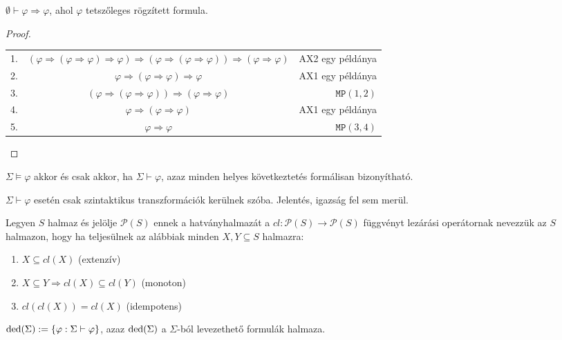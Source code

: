 \begin{exmpl} $\emptyset \vdash \varphi \Rightarrow \varphi$, ahol $\varphi$ tetszőleges rögzített formula.
\begin{proof}
\begin{tabular}{ l c r }
  1. & $(\varphi \Rightarrow (\varphi \Rightarrow \varphi) \Rightarrow \varphi) \Rightarrow (\varphi \Rightarrow (\varphi \Rightarrow \varphi)) \Rightarrow (\varphi \Rightarrow \varphi)$ &  AX2 egy példánya \\
  2. & $\varphi \Rightarrow (\varphi \Rightarrow \varphi) \Rightarrow \varphi$ & AX1 egy példánya \\
  3. &  $(\varphi \Rightarrow (\varphi \Rightarrow \varphi)) \Rightarrow (\varphi \Rightarrow \varphi)$ & $\texttt{MP}(1,2)$ \\
  4. & $\varphi \Rightarrow (\varphi \Rightarrow \varphi)$ & AX1 egy példánya \\
  5. &  $\varphi \Rightarrow \varphi$ & $\texttt{MP}(3,4)$
\end{tabular}
\end{proof}
\end{exmpl}
\begin{theo}
$\Sigma \models \varphi$ akkor és csak akkor, ha $\Sigma \vdash \varphi$, azaz minden helyes következtetés formálisan bizonyítható.
\end{theo}
\begin{megj} $\Sigma \vdash \varphi$ esetén csak szintaktikus transzformációk kerülnek szóba. Jelentés, igazság fel sem merül.
\end{megj}
\begin{defi} Legyen $S$ halmaz és jelölje $\mathcal{P}(S)$ ennek a hatványhalmazát a $cl : \mathcal{P}(S) \rightarrow \mathcal{P}(S)$ függvényt lezárási operátornak nevezzük az $S$ halmazon, hogy ha teljesülnek az alábbiak minden $X, Y \subseteq S$ halmazra:
\begin{enumerate}
\item $X \subseteq cl(X)$ (extenzív)
\item $X \subseteq Y \Rightarrow cl(X) \subseteq cl(Y)$ (monoton)
\item $cl(cl(X))=cl(X)$ (idempotens)
\end{enumerate}
\end{defi}
\begin{defi} $\mathop{\mathrm{ded}}(\Sigma) := \lbrace \varphi : \Sigma \vdash \varphi \rbrace$, azaz $\mathop{\mathrm{ded}}(\Sigma)$ a $\Sigma$-ból levezethető formulák halmaza.
\end{defi}
